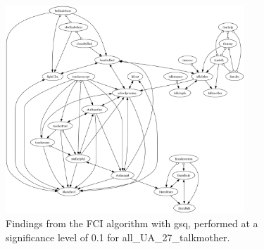 \begin{figure}[htbp]
    \centering
    \includegraphics[width=0.8\textwidth]{Report/final_report/pictures/FCI_gsq_0.1_all_UA_27_talkmother.png}
    \caption{Findings from the FCI algorithm with gsq, performed at a significance level of 0.1 for all_UA_27_talkmother.}
    \label{fig:fci_gsq_0.1all_UA_27_talkmother}
\end{figure}
